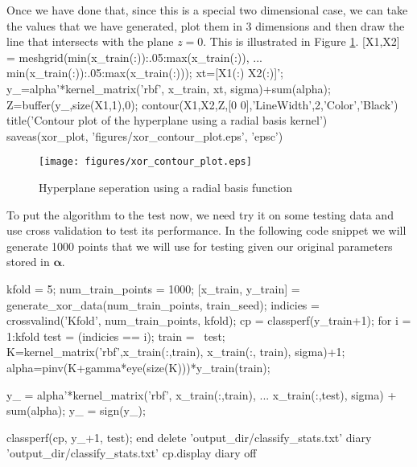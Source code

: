 \documentclass[11pt, twoside]{article}   	%
\newenvironment{matlab}{\comment}{\endcomment}
\begin{document}
Once we have done that, since this is a special two dimensional case, 
we can take the values that we have generated, plot them in 3 dimensions
and then draw the line that intersects with the plane $ z=0$. This is illustrated
in Figure \ref{fig:xor_contour_plot}.
\begin{matlab}
[X1,X2] = meshgrid(min(x_train(:)):.05:max(x_train(:)), ...
   min(x_train(:)):.05:max(x_train(:)));     %
xt=[X1(:) X2(:)]';                        %
y_=alpha'*kernel_matrix('rbf', x_train, xt, sigma)+sum(alpha);    
Z=buffer(y_,size(X1,1),0);                %
contour(X1,X2,Z,[0 0],'LineWidth',2,'Color','Black')
title('Contour plot of the hyperplane using a radial basis kernel')
saveas(xor_plot, 'figures/xor_contour_plot.eps', 'epsc')

\end{matlab}

\begin{figure}[h]
\centering
\texttt{[image: figures/xor\_contour\_plot.eps]}
\caption{Hyperplane seperation using a radial basis function}
\label{fig:xor_contour_plot} 
\end{figure}

To put the algorithm to the test now, we need try it on some testing data
and use cross validation to test its performance. In the following code
snippet we will generate 1000 points that we will use for testing given our
original parameters stored in $\bm{\alpha}$.

\begin{matlab}
kfold = 5; 
num_train_points = 1000; 
[x_train, y_train] = generate_xor_data(num_train_points, train_seed);
indicies = crossvalind('Kfold', num_train_points, kfold); 
cp = classperf(y_train+1);
for i = 1:kfold
   test = (indicies == i); train = ~test;
   K=kernel_matrix('rbf',x_train(:,train), x_train(:, train), sigma)+1; 
   alpha=pinv(K+gamma*eye(size(K)))*y_train(train);
   
   y_ = alpha'*kernel_matrix('rbf', x_train(:,train), ...
      x_train(:,test), sigma) + sum(alpha); 
   y_ = sign(y_);
   
   classperf(cp, y_+1, test);
end
delete 'output_dir/classify_stats.txt'
diary 'output_dir/classify_stats.txt'
cp.display
diary off
\end{matlab}
\end{document}
